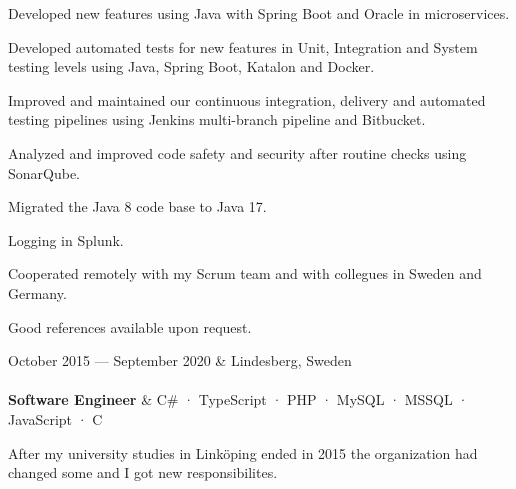 \documentclass{cv-stylish}
\begin{document}
\begin{center}
\begin{adjustwidth}{0.015\linewidth}{0.015\linewidth}
\begin{compactitem}
  \item Developed new features using Java with Spring Boot and Oracle in
    microservices.
  \item Developed automated tests for new features in Unit, Integration and
    System testing levels using Java, Spring Boot, Katalon and Docker.
  \item Improved and maintained our continuous integration, delivery
    and automated testing pipelines using Jenkins multi-branch
    pipeline and Bitbucket.
  \item Analyzed and improved code safety and security after routine
    checks using SonarQube.
  \item Migrated the Java 8 code base to Java 17.
  \item Logging in Splunk.
  \item Cooperated remotely with my Scrum team and with collegues in
    Sweden and Germany.
\end{compactitem}
Good references available upon request.
\end{adjustwidth}

\vspace{1em}
\begin{JobTable}
  October 2015 --- September 2020 & \hfill Lindesberg, Sweden \\[3pt]
   \\[3pt]
  \hspace{5mm} \textbf{Software Engineer}
  & \hfill C\# · TypeScript · PHP · MySQL · MSSQL · JavaScript · C \\
\end{JobTable}
\begin{adjustwidth}{0.015\linewidth}{0.015\linewidth}

After my university studies in Linköping ended in 2015 the organization
had changed some and I got new responsibilites.


\end{adjustwidth}
\end{center}
\end{document}
